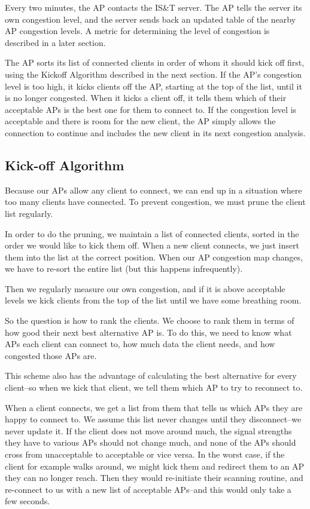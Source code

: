 \documentclass[journal]{IEEEtran}
\begin{document}
Every two minutes, the AP contacts the IS\&T server. The AP tells the server its own congestion level, and the server sends back an updated table of the nearby AP congestion levels. A metric for determining the level of congestion is described in a later section.
 
The AP sorts its list of connected clients in order of whom it should kick off first, using the Kickoff Algorithm described in the next section. If the AP's congestion level is too high, it kicks clients off the AP, starting at the top of the list, until it is no longer congested. When it kicks a client off, it tells them which of their acceptable APs is the best one for them to connect to. If the congestion level is acceptable and there is room for the new client, the AP simply allows the connection to continue and includes the new client in its next congestion analysis.

\subsection{Kick-off Algorithm}
Because our APs allow any client to connect, we can end up in a situation where
too many clients have connected. To prevent congestion, we must prune the
client list regularly.

In order to do the pruning, we maintain a list of connected clients, sorted in
the order we would like to kick them off. When a new client connects, we just
insert them into the list at the correct position. When our AP congestion map
changes, we have to re-sort the entire list (but this happens
infrequently).

Then we regularly measure our own congestion, and if it is above
acceptable levels we kick clients from the top of the list until we have some
breathing room.

So the question is how to rank the clients. We choose to rank them in terms of
how good their next best alternative AP is. To do this, we need to know what
APs each client can connect to, how much data the client needs, and how
congested those APs are.

This scheme also has the advantage of calculating the best alternative for
every client--so when we kick that client, we tell them which AP to try to
reconnect to.
    
When a client connects, we get a list from them that tells us which APs they
are happy to connect to. We assume this list never changes until they
disconnect--we never update it. If the client does not move around much, the
signal strengths they have to various APs should not change much, and none of
the APs should cross from unacceptable to acceptable or vice versa. In the
worst case, if the client for example walks around, we might kick them and
redirect them to an AP they can no longer reach. Then they would re-initiate
their scanning routine, and re-connect to us with a new list of acceptable
APs--and this would only take a few seconds.
\end{document}
